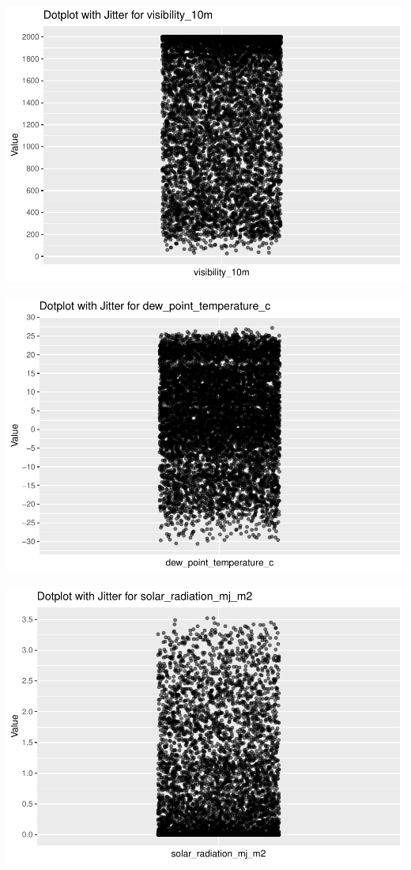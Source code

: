 \documentclass[
  11pt,
  letterpaper,
]{article}
\begin{document}
\begin{center}\includegraphics[width=1.2\linewidth,]{Final_Project_files/figure-latex/Univariate Outlier Check-5} \end{center}

\begin{center}\includegraphics[width=1.2\linewidth,]{Final_Project_files/figure-latex/Univariate Outlier Check-6} \end{center}

\begin{center}\includegraphics[width=1.2\linewidth,]{Final_Project_files/figure-latex/Univariate Outlier Check-7} \end{center}
\end{document}
